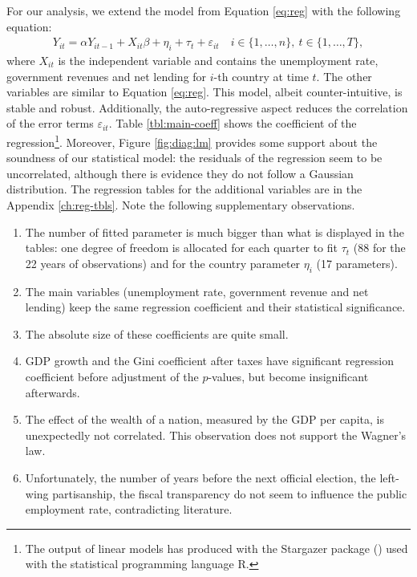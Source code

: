 For our analysis, we extend the model from Equation \eqref{eq:reg} with the
following equation:
\begin{align*}
  Y_{it} = \alpha Y_{i{t-1}} + X_{it}\beta + \eta_i + \tau_t +
  \varepsilon_{it} \quad i \in \{1, \dots, n\},\ t \in \{1, \dots, T\},
\end{align*}
where $X_{it}$ is the independent variable and contains the unemployment rate,
government revenues and net lending for $i$-th country at time $t$. The other
variables are similar to Equation \eqref{eq:reg}. This model, albeit
counter-intuitive, is stable and robust. Additionally, the auto-regressive
aspect reduces the correlation of the error terms $\varepsilon_{it}$.  Table
\ref{tbl:main-coeff} shows the coefficient of the regression\footnote{The
  output of linear models has produced with the Stargazer package
  (\cite{hlavac2015stargazer}) used with the statistical programming language
  \textsf{R}.}. Moreover, Figure \ref{fig:diag:lm} provides some support about
the soundness of our statistical model: the residuals of the regression seem to
be uncorrelated, although there is evidence they do not follow a Gaussian
distribution. The regression tables for the additional variables are in the
Appendix \ref{ch:reg-tbls}.  Note the following supplementary observations.


\begin{enumerate}
\item The number of fitted parameter is much bigger than what is displayed in
  the tables: one degree of freedom is allocated for each quarter to fit $\tau_t$
  (88 for the 22 years of observations) and for the country parameter $\eta_i$
  (17 parameters).
\item The main variables (unemployment rate, government revenue and net
  lending) keep the same regression coefficient and their statistical
  significance.
\item The absolute size of these coefficients are quite small.
\item GDP growth and the Gini coefficient after taxes have significant
  regression coefficient before adjustment of the $p$-values, but become
  insignificant afterwards.
\item The effect of the wealth of a nation, measured by the GDP per capita, is
  unexpectedly not correlated. This observation does not support the Wagner's
  law.
\item Unfortunately, the number of years before the next official election, the
  left-wing partisanship, the fiscal transparency do not seem to influence the
  public employment rate, contradicting literature.
\end{enumerate}


